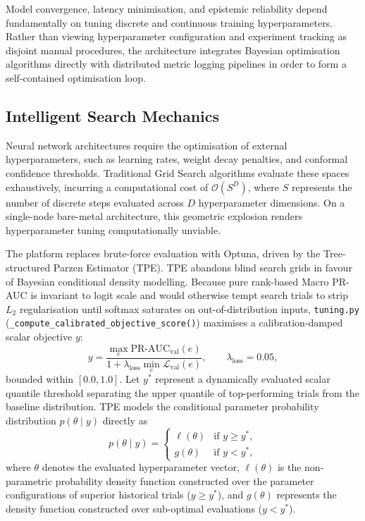 Model convergence, latency minimisation, and epistemic reliability depend fundamentally on tuning discrete and continuous training hyperparameters. Rather than viewing hyperparameter configuration and experiment tracking as disjoint manual procedures, the architecture integrates Bayesian optimisation algorithms directly with distributed metric logging pipelines in order to form a self-contained optimisation loop.

\subsection{Intelligent Search Mechanics}

Neural network architectures require the optimisation of external hyperparameters, such as learning rates, weight decay penalties, and conformal confidence thresholds. Traditional Grid Search algorithms evaluate these spaces exhaustively, incurring a computational cost of $\mathcal{O}(S^D)$, where $S$ represents the number of discrete steps evaluated across $D$ hyperparameter dimensions. On a single-node bare-metal architecture, this geometric explosion renders hyperparameter tuning computationally unviable.

The platform replaces brute-force evaluation with Optuna, driven by the Tree-structured Parzen Estimator (TPE). TPE abandons blind search grids in favour of Bayesian conditional density modelling. Because pure rank-based Macro PR-AUC is invariant to logit scale and would otherwise tempt search trials to strip $L_2$ regularisation until softmax saturates on out-of-distribution inputs, \nolinkurl{tuning.py} (\nolinkurl{_compute_calibrated_objective_score()}) maximises a calibration-damped scalar objective $y$:
\begin{equation}
y = \frac{\max_{e} \text{PR-AUC}_{\text{val}}(e)}{1 + \lambda_{\text{loss}} \min_{e} \mathcal{L}_{\text{val}}(e)}, \qquad \lambda_{\text{loss}} = 0.05,
\end{equation}
bounded within $[0.0, 1.0]$. Let $y^*$ represent a dynamically evaluated scalar quantile threshold separating the upper quantile of top-performing trials from the baseline distribution. TPE models the conditional parameter probability distribution $p(\theta \mid y)$ directly as
\[
p(\theta \mid y) = 
\begin{cases} 
    \ell(\theta) & \text{if } y \ge y^*, \\ 
    g(\theta) & \text{if } y < y^*,
\end{cases}
\]
where $\theta$ denotes the evaluated hyperparameter vector, $\ell(\theta)$ is the non-parametric probability density function constructed over the parameter configurations of superior historical trials ($y \ge y^*$), and $g(\theta)$ represents the density function constructed over sub-optimal evaluations ($y < y^*$).

